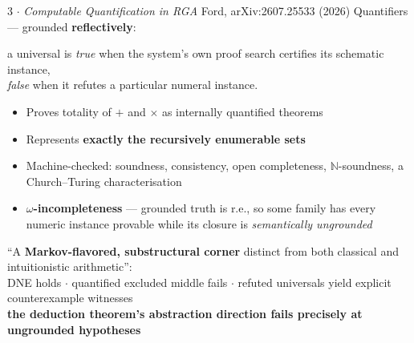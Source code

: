 \documentclass[aspectratio=169,11pt]{beamer}
\newcommand{\key}[1]{{\color{accent}\textbf{#1}}}
\newcommand{\amber}[1]{{\color{gap}\textbf{#1}}}
\begin{document}
\begin{frame}{3 $\cdot$ \emph{Computable Quantification in RGA}}
  {\small Ford, arXiv:2607.25533 (2026)}
  \vfill
  Quantifiers --- grounded \key{reflectively}:
  \begin{center}\small
    a universal is \emph{true} when the system's own proof search certifies its
    schematic instance,\\ \emph{false} when it refutes a particular numeral instance.
  \end{center}
  \vfill
  \begin{itemize}\itemsep0.5em
    \item Proves totality of $+$ and $\times$ as internally quantified theorems
    \item Represents \key{exactly the recursively enumerable sets}
    \item Machine-checked: soundness, consistency, open completeness,
          $\mathbb{N}$-soundness, a Church--Turing characterisation
    \item \key{$\omega$-incompleteness} --- grounded truth is r.e., so some family has
          every numeric instance provable while its closure is
          \emph{semantically ungrounded}
  \end{itemize}
  \vfill
  \begin{center}\footnotesize
    ``A \key{Markov-flavored, substructural corner} distinct from both classical and
    intuitionistic arithmetic'':\\[0.15em]
    DNE holds $\cdot$ quantified excluded middle fails $\cdot$ refuted universals
    yield explicit counterexample witnesses\\
    \amber{the deduction theorem's abstraction direction fails precisely at
    ungrounded hypotheses}
  \end{center}
\end{frame}
\end{document}
